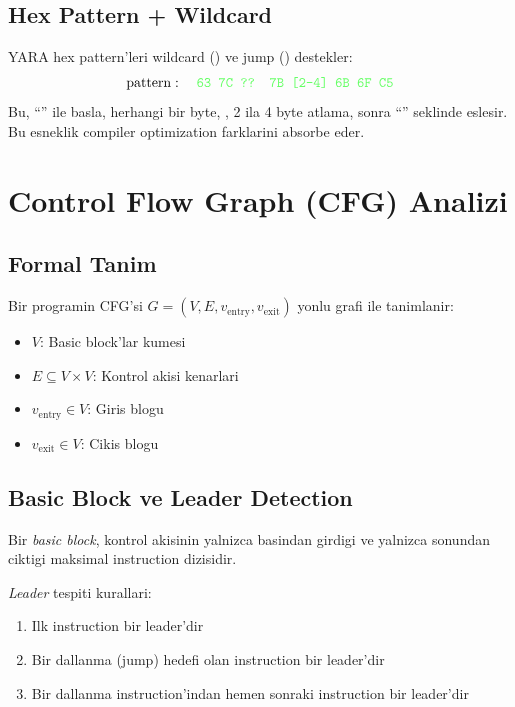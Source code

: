 \subsection{Hex Pattern + Wildcard}

YARA hex pattern'leri wildcard () ve jump (\code{[n-m]}) destekler:
\begin{equation}
  \text{pattern}: \quad \code{63 7C ?? 7B [2-4] 6B 6F C5}
  \label{eq:yara-wildcard}
\end{equation}
Bu, ``'' ile basla, herhangi bir byte, , 2 ila 4
byte atlama, sonra ``'' seklinde eslesir. Bu esneklik
compiler optimization farklarini absorbe eder.


\section{Control Flow Graph (CFG) Analizi}
\label{sec:cfg-analysis}

\subsection{Formal Tanim}

\begin{tanim}
Bir programin CFG'si $G = (V, E, v_{\text{entry}}, v_{\text{exit}})$
yonlu grafi ile tanimlanir:
\begin{itemize}
  \item $V$: Basic block'lar kumesi
  \item $E \subseteq V \times V$: Kontrol akisi kenarlari
  \item $v_{\text{entry}} \in V$: Giris blogu
  \item $v_{\text{exit}} \in V$: Cikis blogu
\end{itemize}
\end{tanim}

\subsection{Basic Block ve Leader Detection}

Bir \emph{basic block}, kontrol akisinin yalnizca basindan girdigi ve
yalnizca sonundan ciktigi maksimal instruction dizisidir.

\emph{Leader} tespiti kurallari:
\begin{enumerate}
  \item Ilk instruction bir leader'dir
  \item Bir dallanma (jump) hedefi olan instruction bir leader'dir
  \item Bir dallanma instruction'indan hemen sonraki instruction bir leader'dir
\end{enumerate}

